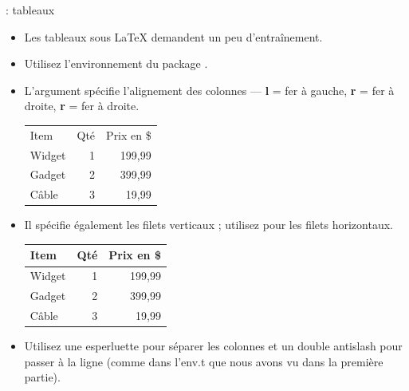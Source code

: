 \documentclass{beamer}
\begin{document}
\begin{frame}[fragile]{\insertsection: tableaux}
\begin{itemize}
\item Les tableaux sous \LaTeX{} demandent un peu d'entraînement.
\item Utilisez l'environnement  du package .
\item L'argument spécifie l'alignement des colonnes --- \textbf{l} = fer à gauche, \textbf{r} = fer à droite, \textbf{r} = fer à droite.
\begin{exampletwouptiny}
\begin{tabular}{lrr}
Item   & Qté & Prix en \$ \\
Widget & 1   & 199,99  \\
Gadget & 2   & 399,99  \\
Câble  & 3   & 19,99   \\
\end{tabular}
\end{exampletwouptiny}
\item Il spécifie également les filets verticaux ; utilisez  pour les filets horizontaux.
\begin{exampletwouptiny}
\begin{tabular}{|l|r|r|} \hline
Item   & Qté & Prix en \$ \\\hline
Widget & 1   & 199,99  \\
Gadget & 2   & 399,99  \\
Câble  & 3   & 19,99   \\\hline
\end{tabular}
\end{exampletwouptiny}
\item Utilisez une esperluette \keystrokebftt{\&} pour séparer les colonnes et un double antislash \keystrokebftt{\bs}\keystrokebftt{\bs} pour passer à la ligne (comme dans l'env.t  que nous avons vu dans la première partie).
\end{itemize}
\end{frame}
\end{document}
